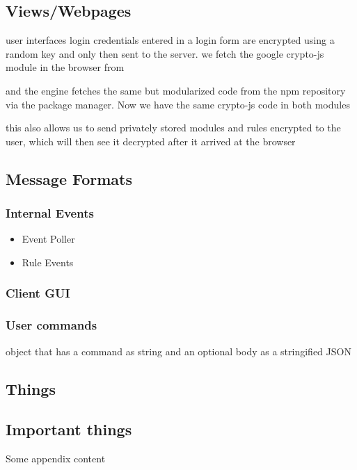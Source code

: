 \documentclass{article}
\begin{document}
\subsection{Views/Webpages}
user interfaces
login
credentials entered in a login form are encrypted using a random key and only then sent to the server.
we fetch the google crypto-js module in the browser from

and the engine fetches the same but modularized code from the npm repository via the package manager. Now we have the same crypto-js code in both modules

this also allows us to send privately stored modules and rules encrypted to the user, which will then see it decrypted after it arrived at the browser

\subsection{Message Formats}
\subsubsection{Internal Events}
	\begin{itemize}
	  \item Event Poller
	  \item Rule Events
	\end{itemize}


\subsubsection{Client GUI}


\subsubsection{User commands}
object that has a command as string and an optional body as a stringified JSON





\newpage
\renewcommand*\appendixpagename{APPENDIX}
\renewcommand*\appendixtocname{APPENDIX}
\begin{appendices}
 \section{Things}
   \subsection{Important things}
 Some appendix content
 
\end{appendices}
\end{document}
